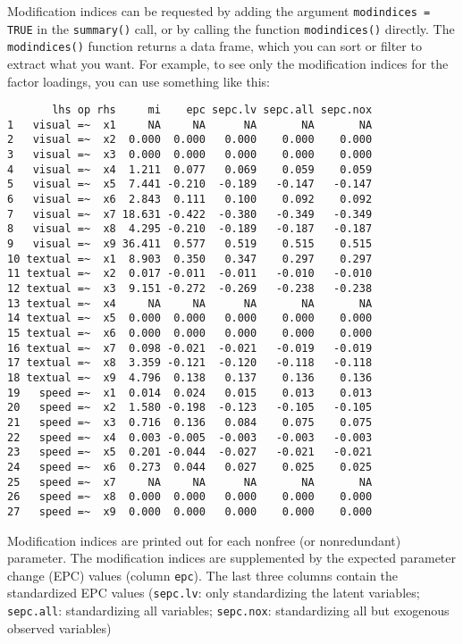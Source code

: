 Modification indices can be requested by adding the argument
\texttt{modindices = TRUE} in the \texttt{summary()} call, or by calling
the function \texttt{modindices()} directly. The \texttt{modindices()}
function returns a data frame, which you can sort or filter to extract
what you want. For example, to see only the modification indices for the
factor loadings, you can use something like this:

\begin{Shaded}
\begin{Highlighting}[]
\StringTok{ }
            
\StringTok{ }
\NormalTok{mi[mi$op ==}\NormalTok{,]}
\end{Highlighting}
\end{Shaded}

\begin{verbatim}
       lhs op rhs     mi    epc sepc.lv sepc.all sepc.nox
1   visual =~  x1     NA     NA      NA       NA       NA
2   visual =~  x2  0.000  0.000   0.000    0.000    0.000
3   visual =~  x3  0.000  0.000   0.000    0.000    0.000
4   visual =~  x4  1.211  0.077   0.069    0.059    0.059
5   visual =~  x5  7.441 -0.210  -0.189   -0.147   -0.147
6   visual =~  x6  2.843  0.111   0.100    0.092    0.092
7   visual =~  x7 18.631 -0.422  -0.380   -0.349   -0.349
8   visual =~  x8  4.295 -0.210  -0.189   -0.187   -0.187
9   visual =~  x9 36.411  0.577   0.519    0.515    0.515
10 textual =~  x1  8.903  0.350   0.347    0.297    0.297
11 textual =~  x2  0.017 -0.011  -0.011   -0.010   -0.010
12 textual =~  x3  9.151 -0.272  -0.269   -0.238   -0.238
13 textual =~  x4     NA     NA      NA       NA       NA
14 textual =~  x5  0.000  0.000   0.000    0.000    0.000
15 textual =~  x6  0.000  0.000   0.000    0.000    0.000
16 textual =~  x7  0.098 -0.021  -0.021   -0.019   -0.019
17 textual =~  x8  3.359 -0.121  -0.120   -0.118   -0.118
18 textual =~  x9  4.796  0.138   0.137    0.136    0.136
19   speed =~  x1  0.014  0.024   0.015    0.013    0.013
20   speed =~  x2  1.580 -0.198  -0.123   -0.105   -0.105
21   speed =~  x3  0.716  0.136   0.084    0.075    0.075
22   speed =~  x4  0.003 -0.005  -0.003   -0.003   -0.003
23   speed =~  x5  0.201 -0.044  -0.027   -0.021   -0.021
24   speed =~  x6  0.273  0.044   0.027    0.025    0.025
25   speed =~  x7     NA     NA      NA       NA       NA
26   speed =~  x8  0.000  0.000   0.000    0.000    0.000
27   speed =~  x9  0.000  0.000   0.000    0.000    0.000
\end{verbatim}

Modification indices are printed out for each nonfree (or nonredundant)
parameter. The modification indices are supplemented by the expected
parameter change (EPC) values (column \texttt{epc}). The last three
columns contain the standardized EPC values (\texttt{sepc.lv}: only
standardizing the latent variables; \texttt{sepc.all}: standardizing all
variables; \texttt{sepc.nox}: standardizing all but exogenous observed
variables)
